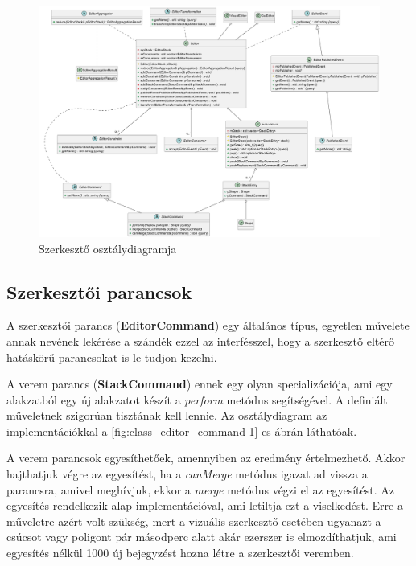 \begin{figure}[H]
	\centering
	\includegraphics[width=1\linewidth]{images/class_editor.png}
	\caption{Szerkesztő osztálydiagramja}
	\label{fig:class_editor-1}
\end{figure}


\subsection{Szerkesztői parancsok}

A szerkesztői parancs (\textbf{EditorCommand}) egy általános típus, egyetlen művelete annak nevének lekérése a szándék ezzel az interfésszel, hogy a szerkesztő eltérő hatáskörű parancsokat is le tudjon kezelni.

A verem parancs (\textbf{StackCommand}) ennek egy olyan specializációja, ami egy alakzatból egy új alakzatot készít a \textit{perform} metódus segítségével. A definiált műveletnek szigorúan tisztának kell lennie. Az osztálydiagram az implementációkkal a \ref{fig:class_editor_command-1}-es ábrán láthatóak.

A verem parancsok egyesíthetőek, amennyiben az eredmény értelmezhető. Akkor hajthatjuk végre az egyesítést, ha a \textit{canMerge} metódus igazat ad vissza a parancsra, amivel meghívjuk, ekkor a \textit{merge} metódus végzi el az egyesítést. Az egyesítés rendelkezik alap implementációval, ami letiltja ezt a viselkedést. Erre a műveletre azért volt szükség, mert a vizuális szerkesztő esetében ugyanazt a csúcsot vagy poligont pár másodperc alatt akár ezerszer is elmozdíthatjuk, ami egyesítés nélkül 1000 új bejegyzést hozna létre a szerkesztői veremben.


